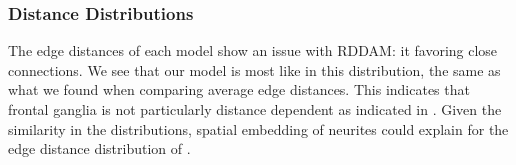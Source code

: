 \subsubsection{Distance Distributions} The edge distances of each model show an issue with RDDAM: it favoring close connections. We see that our model is most like \ce in this distribution, the same as what we found when comparing average edge distances. This indicates that \ce frontal ganglia is not particularly distance dependent as indicated in \cite{Itzhack}. Given the similarity in the distributions, spatial embedding of neurites could explain for the edge distance distribution of \ce. 